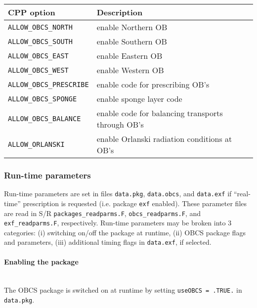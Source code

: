 \begin{table}[!ht]
\centering
  \label{tab:pkg:obcs:cpp}
  {\footnotesize
    \begin{tabular}{|l|l|}
      \hline 
      \textbf{CPP option}  &  \textbf{Description}  \\
      \hline \hline
        \texttt{ALLOW\_OBCS\_NORTH} & 
          enable Northern OB \\
        \texttt{ALLOW\_OBCS\_SOUTH} & 
          enable Southern OB \\
        \texttt{ALLOW\_OBCS\_EAST} & 
          enable Eastern OB \\
        \texttt{ALLOW\_OBCS\_WEST} & 
          enable Western OB \\
      \hline
        \texttt{ALLOW\_OBCS\_PRESCRIBE} & 
          enable code for prescribing OB's \\
        \texttt{ALLOW\_OBCS\_SPONGE} & 
          enable sponge layer code \\
        \texttt{ALLOW\_OBCS\_BALANCE} & 
          enable code for balancing transports through OB's \\
        \texttt{ALLOW\_ORLANSKI} & 
          enable Orlanski radiation conditions at OB's \\
      \hline
    \end{tabular}
  }
  \caption{~}
\end{table}



\subsubsection{Run-time parameters
\label{sec:pkg:obcs:runtime}}

Run-time parameters are set in files 
\texttt{data.pkg}, \texttt{data.obcs}, and \texttt{data.exf} 
if ``real-time'' prescription is requested 
(i.e. package \texttt{exf} enabled).
These parameter files are read in S/R
\texttt{packages\_readparms.F}, \texttt{obcs\_readparms.F}, and
\texttt{exf\_readparms.F}, respectively.
Run-time parameters may be broken into 3 categories:
(i) switching on/off the package at runtime,
(ii) OBCS package flags and parameters,
(iii) additional timing flags in \texttt{data.exf}, if selected.

\paragraph{Enabling the package}
~ \\
%
The OBCS package is switched on at runtime by setting
\texttt{useOBCS = .TRUE.} in \texttt{data.pkg}.

